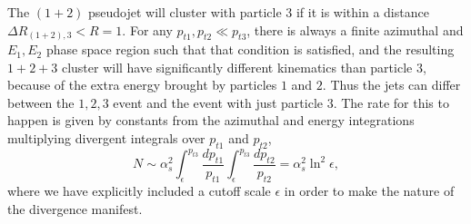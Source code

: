 \documentclass[nofootinbib,twocolumn,preprintnumbers,superscriptaddress,aps]{revtex4-2}
\newcommand{\as}{\alpha_s}
\begin{document}
The $(1+2)$ pseudojet will cluster with particle $3$ if it is within a
distance $\Delta R_{(1+2),3} < R=1$.
%
For any $p_{t1},p_{t2} \ll p_{t3}$, there is always a finite azimuthal
and $E_1,E_2$ phase space region such that that condition is
satisfied, and the resulting $1+2+3$ cluster will have significantly different
kinematics than particle $3$, because of the extra energy brought by
particles $1$ and $2$.
%
Thus the jets can differ between the $1,2,3$ event and the event with
just particle $3$.
%
The rate for this to happen is given by constants from the azimuthal
and energy integrations multiplying divergent integrals over
$p_{t1}$ and $p_{t2}$,
\begin{equation}
  N \sim \as^2
      \int^{p_{t3}}_\epsilon \frac{dp_{t1}}{p_{t1}}
      \int^{p_{t3}}_\epsilon \frac{dp_{t2}}{p_{t2}}
  = \as^2 \ln^2 \epsilon,
  \label{eq:CMP-as2issue-failure}
\end{equation}
where we have explicitly included a cutoff scale $\epsilon$ in order
to make the nature of the divergence manifest.
\end{document}
